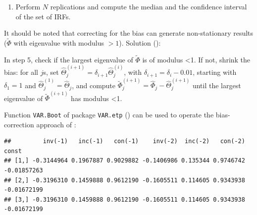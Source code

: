 \documentclass[
  12pt,
]{book}
\newenvironment{Shaded}{\begin{snugshade}}{\end{snugshade}}
\newcommand{\AttributeTok}[1]{\textcolor[rgb]{0.77,0.63,0.00}{#1}}
\newcommand{\CommentTok}[1]{\textcolor[rgb]{0.56,0.35,0.01}{\textit{#1}}}
\newcommand{\DecValTok}[1]{\textcolor[rgb]{0.00,0.00,0.81}{#1}}
\newcommand{\FunctionTok}[1]{\textcolor[rgb]{0.00,0.00,0.00}{#1}}
\newcommand{\NormalTok}[1]{#1}
\newcommand{\OtherTok}[1]{\textcolor[rgb]{0.56,0.35,0.01}{#1}}
\newcommand{\SpecialCharTok}[1]{\textcolor[rgb]{0.00,0.00,0.00}{#1}}
\newcommand{\StringTok}[1]{\textcolor[rgb]{0.31,0.60,0.02}{#1}}
\providecommand{\tightlist}{%
  \setlength{\itemsep}{0pt}\setlength{\parskip}{0pt}}
\theoremstyle{definition}
\theoremstyle{definition}
\theoremstyle{definition}
\theoremstyle{definition}
\theoremstyle{remark}
\begin{document}
\begin{enumerate}
\def\labelenumi{\arabic{enumi}.}
\setcounter{enumi}{6}
\tightlist
\item
  Perform \(N\) replications and compute the median and the confidence interval of the set of IRFs.
\end{enumerate}

It should be noted that correcting for the bias can generate non-stationary results (\(\tilde \Phi\) with eigenvalue with modulus \(>1\)). Solution (\citet{Kilian_1998}):

In step 5, check if the largest eigenvalue of \(\tilde\Phi\) is of modulus \textless1.
If not, shrink the bias: for all \(j\)s, set \(\widehat{\Theta}_j^{(i+1)}=\delta_{i+1}\widehat{\Theta}_j^{(i)}\), with \(\delta_{i+1}=\delta_i-0.01\), starting with \(\delta_1=1\) and \(\widehat{\Theta}_j^{(1)} =\widehat{\Theta}_j\), and compute \(\widetilde{\Phi}_j^{(i+1)}=\widehat{\Phi}_j-\widehat{\Theta}_j^{(i+1)}\) until the largest eigenvalue of \(\tilde\Phi^{(i+1)}\) has modulus \textless1.

Function \texttt{VAR.Boot} of package \texttt{VAR.etp} (\citet{VARetp}) can be used to operate the bias-correction approach of \citet{Kilian_1998}:

\begin{Shaded}
\end{Shaded}

\begin{verbatim}
##         inv(-1)   inc(-1)   con(-1)    inv(-2)  inc(-2)   con(-2)       const
## [1,] -0.3144964 0.1967887 0.9029882 -0.1406986 0.135344 0.9746742 -0.01857263
## [2,] -0.3196310 0.1459888 0.9612190 -0.1605511 0.114605 0.9343938 -0.01672199
## [3,] -0.3196310 0.1459888 0.9612190 -0.1605511 0.114605 0.9343938 -0.01672199
\end{verbatim}
\end{document}
